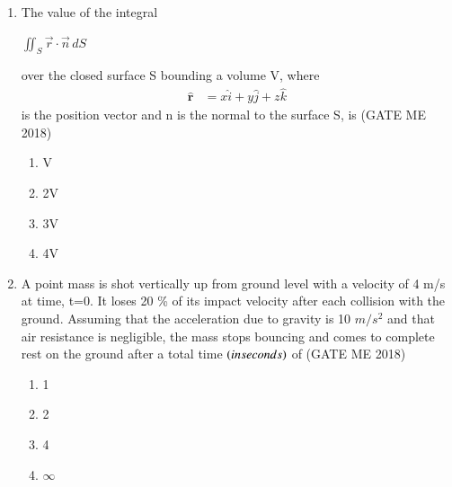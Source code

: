 \documentclass[journal]{IEEEtran}
\numberwithin{equation}{enumi}
\numberwithin{figure}{enumi}
\begin{document}
\begin{enumerate}
\item The value of the integral
 
     
    $\iint_{S} \vec{r} \cdot \vec{n} \, dS$
 
over the closed surface S bounding a volume V, where 
\begin{align}
\hat{\mathbf{r}} &= x \hat{i} + y \hat{j} + z \hat{k}
\end{align}
  is the position vector
and n is the normal to the surface S, is
\hfill{(GATE ME 2018)}
\begin{enumerate}
\item V
\item 2V
\item 3V
\item 4V
\end{enumerate}



\item A point mass is shot vertically up from ground level with a velocity of 4 m/s at time, t=0.
It loses 20 \% of its impact velocity after each collision with the ground. Assuming that the
acceleration due to gravity is 10 $m/s^2$ and that air resistance is negligible, the mass stops
bouncing and comes to complete rest on the ground after a total time $\left(in seconds\right)$ of
\hfill{(GATE ME 2018)}
\begin{enumerate}
    \item 1
    \item 2
    \item 4
\item $\infty$
\end{enumerate}


\end{enumerate}
\end{document}
